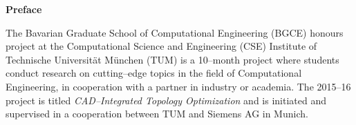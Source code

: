 \clearemptydoublepage
{}
{}	


\vspace*{3cm}

\begin{flushleft}
{\Large \bf Preface}
\end{flushleft}

\vspace{1cm}
The Bavarian Graduate School of Computational Engineering (BGCE) honours project at the Computational Science and Engineering (CSE) Institute of Technische Universit{\"a}t M{\"u}nchen (TUM) is a 10--month project where students conduct research on cutting--edge topics in the field of Computational Engineering, in cooperation with a partner in industry or academia. The 2015--16 project is titled \emph{CAD--Integrated Topology Optimization} and is initiated and supervised in a cooperation between TUM and Siemens AG in Munich.


\newpage
